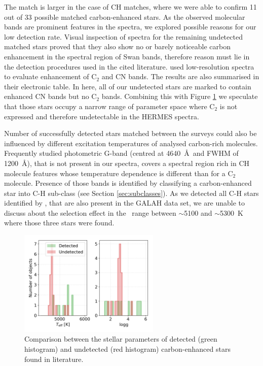 The match is larger in the case of CH matches, where we were able to confirm 11 out of 33 possible matched carbon-enhanced stars. As the observed molecular bands are prominent features in the spectra, we explored possible reasons for our low detection rate. Visual inspection of spectra for the remaining undetected matched stars proved that they also show no or barely noticeable carbon enhancement in the spectral region of Swan bands, therefore reason must lie in the detection procedures used in the cited literature. \citet{2001A&A...375..366C} used low-resolution spectra to evaluate enhancement of C$_2$ and CN bands. The results are also summarised in their electronic table. In here, all of our undetected stars are marked to contain enhanced CN bands but no C$_2$ bands. Combining this with Figure \ref{fig:ch_xmatch} we speculate that those stars occupy a narrow range of parameter space where C$_2$ is not expressed and therefore undetectable in the HERMES spectra. 

Number of successfully detected stars matched between the surveys could also be influenced by different excitation temperatures of analysed carbon-rich molecules. Frequently studied photometric G-band (centred at 4640~\AA\ and FWHM of 1200~\AA), that is not present in our spectra, covers a spectral region rich in CH molecule features whose temperature dependence is different than for a C$_2$ molecule. Presence of those bands is identified by classifying a carbon-enhanced star into C-H sub-class (see Section \ref{sec:subclasses}). As we detected all C-H stars identified by \citet{2016ApJS..226....1J}, that are also present in the GALAH data set, we are unable to discuss about the selection effect in the \Teff\ range between $\sim$5100 and $\sim$5300~K where those three stars were found.

\begin{figure}
	\centering
	\includegraphics[width=0.6\textwidth]{ch_comb.png}
	\caption{Comparison between the stellar parameters of detected (green histogram) and undetected (red histogram) carbon-enhanced stars found in literature.}
	\label{fig:ch_xmatch}
\end{figure}

